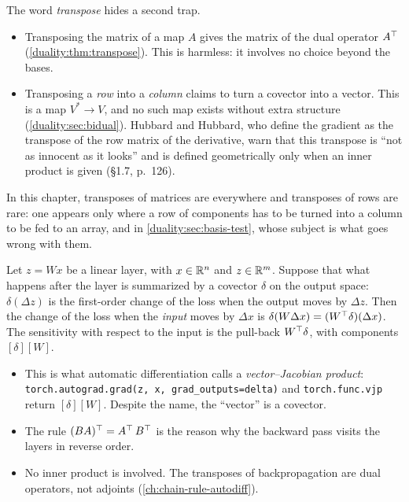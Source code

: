 \begin{notechapter}
\begin{pitfall}
The word \emph{transpose} hides a second trap.
\begin{itemize}[nosep]
  \item Transposing the matrix of a map $A$ gives the matrix of the dual
        operator $A^{\top}$ (\cref{duality:thm:transpose}). This is
        harmless: it involves no choice beyond the bases.
  \item Transposing a \emph{row} into a \emph{column} claims to turn a
        covector into a vector. This is a map $V^*\to V$, and no such map
        exists without extra structure (\cref{duality:sec:bidual}).
        Hubbard and Hubbard, who define the gradient as the transpose of
        the row matrix of the derivative, warn that this transpose is
        ``not as innocent as it looks'' and is defined geometrically only
        when an inner product is given (\S1.7, p.~126).
\end{itemize}
In this chapter, transposes of matrices are everywhere and transposes
of rows are rare: one appears only where a row of components has to be
turned into a column to be fed to an array, and in
\cref{duality:sec:basis-test}, whose subject is what goes wrong with
them.
\end{pitfall}

\begin{mlthread}
Let $z = Wx$ be a linear layer, with $x\in\mathbb{R}^n$ and $z\in\mathbb{R}^m$. Suppose
that what happens after the layer is summarized by a covector $\delta$ on
the output space: $\delta(\Delta z)$ is the first-order change of the loss
when the output moves by $\Delta z$. Then the change of the loss when the
\emph{input} moves by $\Delta x$ is
$\delta(W\Delta x) = (W^{\top}\delta)(\Delta x)$. The sensitivity with
respect to the input is the pull-back $W^{\top}\delta$, with components
$[\delta][W]$.
\begin{itemize}[nosep]
  \item This is what automatic differentiation calls a
        \emph{vector--Jacobian product}: \texttt{torch.autograd.grad(z, x,
        grad\_outputs=delta)} and \texttt{torch.func.vjp} return
        $[\delta][W]$. Despite the name, the ``vector'' is a covector.
  \item The rule $(BA)^{\top} = A^{\top}\,B^{\top}$ is the reason why the
        backward pass visits the layers in reverse order.
  \item No inner product is involved. The transposes of backpropagation
        are dual operators, not adjoints
        (\cref{ch:chain-rule-autodiff}).
\end{itemize}
\end{mlthread}


\end{notechapter}

